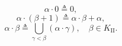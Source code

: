 $$\alpha \cdot 0 \triangleq 0,$$
$$\alpha \cdot (\beta + 1) \triangleq \alpha \cdot \beta + \alpha,$$
$$\alpha \cdot \beta \triangleq \bigcup_{\gamma < \beta} (\alpha \cdot \gamma), \quad \beta \in K_{\mathrm{II}}.$$
